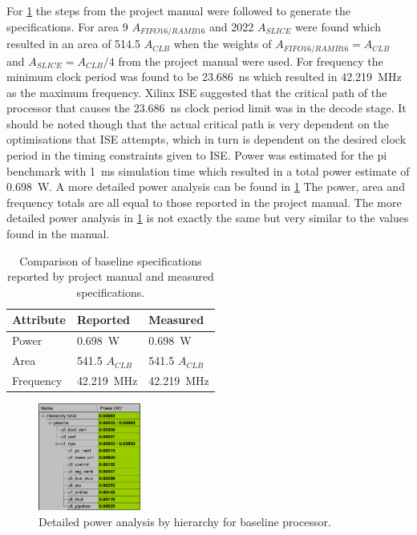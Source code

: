 \documentclass[final]{article}
\begin{document}
For \cref{tab:baselineperformance} the steps from the project manual were followed to generate the specifications.
For area 9 $A_{FIFO16/RAMB16}$ and 2022 $A_{SLICE}$ were found which resulted in an area of 514.5 $A_{CLB}$ when the weights of $A_{FIFO16/RAMB16} = A_{CLB}$ and $A_{SLICE} = A_{CLB}/4$ from the project manual were used.
For frequency the minimum clock period was found to be \SI{23.686}{\nano\second} which resulted in \SI{42.219}{\mega\hertz} as the maximum frequency.
Xilinx ISE suggested that the critical path of the processor that causes the \SI{23.686}{\nano\second} clock period limit was in the decode stage. 
It should be noted though that the actual critical path is very dependent on the optimisations that ISE attempts, which in turn is dependent on the desired clock period in the timing constraints given to ISE.
Power was estimated for the pi benchmark with \SI{1}{\milli\second} simulation time which resulted in a total power estimate of \SI{0.698}{\watt}.
A more detailed power analysis can be found in \cref{fig:baselinepower}
The power, area and frequency totals are all equal to those reported in the project manual.
The more detailed power analysis in \cref{fig:baselinepower} is not exactly the same but very similar to the values found in the manual.


\begin{table}[H]
    \centering
    \caption{Comparison of baseline specifications reported by project manual and measured specifications.}
    \label{tab:baselineperformance}
    \begin{tabular}{lll}
        \toprule
        \textbf{Attribute} & \textbf{Reported} & \textbf{Measured}      \\
        \midrule
        Power    &  \SI{0.698}{\watt}        & \SI{0.698}{\watt}        \\
        Area     &  \num{541.5} $A_{CLB}$    & \num{541.5} $A_{CLB}$    \\
        Frequency&  \SI{42.219}{\mega\hertz} & \SI{42.219}{\mega\hertz} \\
        \bottomrule
    \end{tabular}

\end{table}

\begin{figure}[H]
\centering
\includegraphics[width=0.3\textwidth]{resources/baselinepower.png}
\caption{Detailed power analysis by hierarchy for baseline processor.}
\label{fig:baselinepower}
\end{figure}
\end{document}
